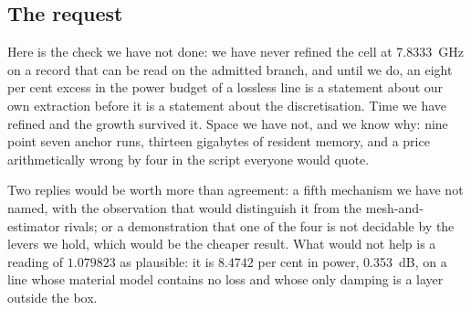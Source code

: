 \subsection{The request}
\label{sec:openproblem-request}

Here is the check we have not done: we have never refined the cell at \SI{7.8333}{\giga\hertz} on a record that can
be read on the admitted branch, and until we do, an eight per cent excess in the power budget of a lossless line is
a statement about our own extraction before it is a statement about the discretisation. Time we have refined and
the growth survived it. Space we have not, and we know why: nine point seven anchor runs, thirteen gigabytes of
resident memory, and a price arithmetically wrong by four in the script everyone would quote.

Two replies would be worth more than agreement: a fifth mechanism we have not named, with the observation that
would distinguish it from the mesh-and-estimator rivals; or a demonstration that one of the four is not decidable by
the levers we hold, which would be the cheaper result. What would not help is a reading of $1.079823$ as plausible:
it is $8.4742$ per cent in power, \SI{0.353}{dB}, on a line whose material model contains no loss and whose only
damping is a layer outside the box.
